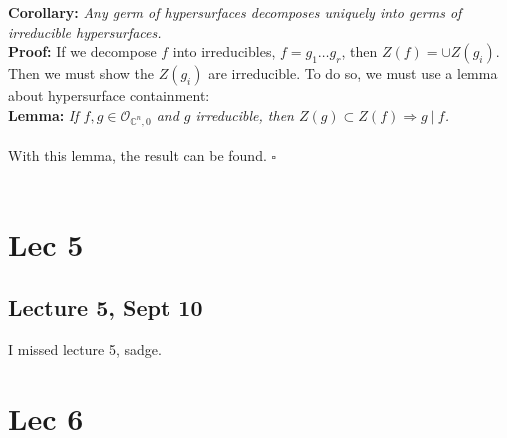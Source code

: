 \documentclass[12pt]{report}
\theoremstyle{definition}
\theoremstyle{remark}
\numberwithin{equation}{section}
\theoremstyle{definition}
\newcommand{\bb}[1]{\mathbb{#1}}
\newcommand{\mqed}{\hfill\newline\null \hfill$\square$\\ }
\begin{document}
\textbf{Corollary: }\textit{Any germ of hypersurfaces decomposes uniquely into germs of irreducible hypersurfaces.}\\
\textbf{Proof: }If we decompose $f$ into irreducibles, $f = g_1\dots g_r$, then $Z(f) = \cup Z(g_i)$. Then we must show the $Z(g_i)$ are irreducible. To do so, we must use a lemma about hypersurface containment:\\
\textbf{Lemma: }\textit{If $f,g \in \mathcal{O}_{\bb C^n,0}$ and $g$ irreducible, then $Z(g) \subset Z(f) \Rightarrow g\ |\ f$.  }\\\\
With this lemma, the result can be found. \mqed\\
\chapter{Lec 5}
\section*{Lecture 5, Sept 10}
\label{sec:5}
I missed lecture 5, sadge.
\chapter{Lec 6}
\end{document}
